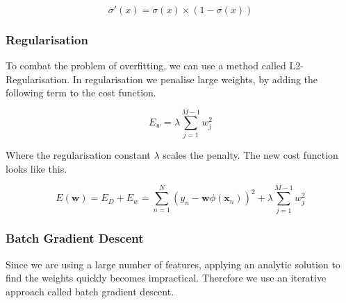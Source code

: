 \[ \sigma'(x) = \sigma(x) \times (1-\sigma(x)) \] 










\subsubsection{Regularisation}
To combat the problem of overfitting, we can use a method called L2-Regularisation.
In regularisation we penalise large weights, by adding the following term to the cost function.

\[ E_w = \lambda \sum_{j=1}^{M-1} w_j^2 \]

Where the regularisation constant $\lambda$ scales the penalty. 
The new cost function looks like this.

\[ E(\textbf{w})
  = E_D + E_w 
  = \sum_{n=1}^{N} \left(y_n - \textbf{w} \phi(\textbf{x}_n) \right)^2 + \lambda \sum_{j=1}^{M-1} w_j^2 \]

\begin{flushright}
\cite[online course]{courseraAI}
\end{flushright}

\subsubsection{Batch Gradient Descent}

Since we are using a large number of features, applying an analytic solution to find the weights quickly becomes impractical.
Therefore we use an iterative approach called batch gradient descent.

